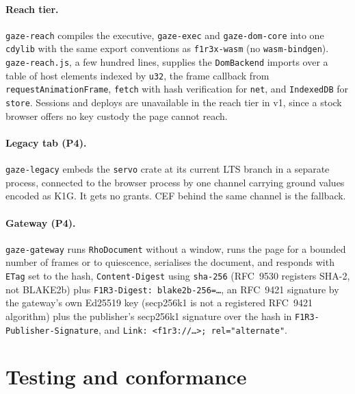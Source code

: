 \documentclass[11pt]{article}
\theoremstyle{definition}
\theoremstyle{remark}
\newcommand{\code}[1]{\texttt{#1}}
\begin{document}
\paragraph{Reach tier.} \code{gaze-reach} compiles the executive, \code{gaze-exec}
and \code{gaze-dom-core} into one \code{cdylib} with the same export conventions as
\code{f1r3x-wasm} (no \code{wasm-bindgen}). \code{gaze-reach.js}, a few hundred
lines, supplies the \code{DomBackend} imports over a table of host elements indexed
by \code{u32}, the frame callback from \code{requestAnimationFrame}, \code{fetch}
with hash verification for \code{net}, and \code{IndexedDB} for \code{store}.
Sessions and deploys are unavailable in the reach tier in v1, since a stock browser
offers no key custody the page cannot reach.

\paragraph{Legacy tab (P4).}\label{sec:legacy} \code{gaze-legacy} embeds the \code{servo} crate at its
current LTS branch in a separate process, connected to the browser process by one
channel carrying ground values encoded as K1G. It gets no grants. CEF behind the
same channel is the fallback.

\paragraph{Gateway (P4).} \code{gaze-gateway} runs \code{RhoDocument} without a
window, runs the page for a bounded number of frames or to quiescence, serialises the
document, and responds with \code{ETag} set to the hash, \code{Content-Digest} using
\code{sha-256} (RFC~9530 registers SHA-2, not BLAKE2b) plus
\code{F1R3-Digest:~blake2b-256=\ldots}, an RFC~9421 signature by the gateway's own
Ed25519 key (secp256k1 is not a registered RFC~9421 algorithm) plus the publisher's
secp256k1 signature over the hash in \code{F1R3-Publisher-Signature}, and
\code{Link:~<f1r3://\ldots>;~rel="alternate"}.

\section{Testing and conformance}\label{sec:testing}
\end{document}
